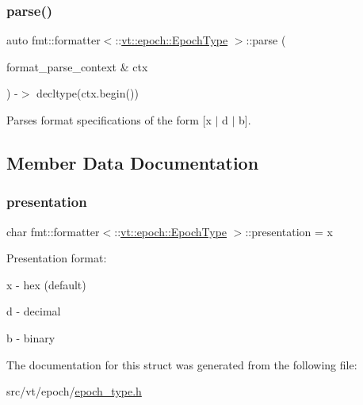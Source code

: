 \subsubsection{\texorpdfstring{parse()}{parse()}}
{\footnotesize\ttfamily auto fmt\+::formatter$<$\+::\hyperlink{structvt_1_1epoch_1_1_epoch_type}{vt\+::epoch\+::\+Epoch\+Type} $>$\+::parse (\begin{DoxyParamCaption}\item[{format\+\_\+parse\+\_\+context \&}]{ctx }\end{DoxyParamCaption}) -\/$>$ decltype(ctx.\+begin()) \hspace{0.3cm}{\ttfamily [inline]}}



Parses format specifications of the form \mbox{[}\textquotesingle{}x\textquotesingle{} $\vert$ \textquotesingle{}d\textquotesingle{} $\vert$ \textquotesingle{}b\textquotesingle{}\mbox{]}. 



\subsection{Member Data Documentation}
\mbox{\label{structfmt_1_1formatter_3_1_1vt_1_1epoch_1_1_epoch_type_01_4_adbbd56e88fa7fa5151ed77bbc9b66895}} 
\subsubsection{\texorpdfstring{presentation}{presentation}}
{\footnotesize\ttfamily char fmt\+::formatter$<$\+::\hyperlink{structvt_1_1epoch_1_1_epoch_type}{vt\+::epoch\+::\+Epoch\+Type} $>$\+::presentation = \textquotesingle{}x\textquotesingle{}}

Presentation format\+:
\begin{DoxyItemize}
\item \textquotesingle{}x\textquotesingle{} -\/ hex (default)
\item \textquotesingle{}d\textquotesingle{} -\/ decimal
\item \textquotesingle{}b\textquotesingle{} -\/ binary 
\end{DoxyItemize}

The documentation for this struct was generated from the following file\+:\begin{DoxyCompactItemize}
\item 
src/vt/epoch/\hyperlink{epoch__type_8h}{epoch\+\_\+type.\+h}\end{DoxyCompactItemize}
